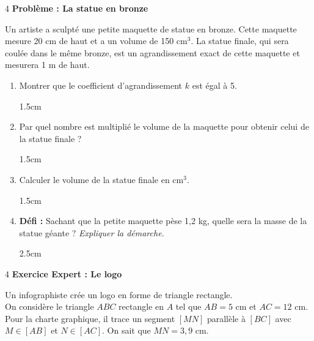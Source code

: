 \documentclass[a4paper]{book}
\begin{document}
{     
    \begin{exerciceNote}{4}
        \textbf{Problème : La statue en bronze}
        
        Un artiste a sculpté une petite maquette de statue en bronze. Cette maquette mesure 20 cm de haut et a un volume de 150 cm$^3$. 
        La statue finale, qui sera coulée dans le même bronze, est un agrandissement exact de cette maquette et mesurera 1 m de haut.
        
        \begin{enumerate}
            \item Montrer que le coefficient d'agrandissement $k$ est égal à 5.
            \begin{ZoneReponse}{1.5cm}
            \end{ZoneReponse}
            
            \item Par quel nombre est multiplié le volume de la maquette pour obtenir celui de la statue finale ?
            \begin{ZoneReponse}{1.5cm}
            \end{ZoneReponse}
            
            \item Calculer le volume de la statue finale en cm$^3$.
            \begin{ZoneReponse}{1.5cm}
            \end{ZoneReponse}

\newpage
            
            \item \textbf{Défi :} Sachant que la petite maquette pèse 1,2 kg, quelle sera la masse de la statue géante ? \textit{Expliquer la démarche.}
            \begin{ZoneReponse}{2.5cm}
            \end{ZoneReponse}
        \end{enumerate}
    \end{exerciceNote}


    \begin{exerciceNote}{4}
        \textbf{Exercice Expert : Le logo}
        
        Un infographiste crée un logo en forme de triangle rectangle. \\
        On considère le triangle $ABC$ rectangle en $A$ tel que $AB = 5$ cm et $AC = 12$ cm.
        Pour la charte graphique, il trace un segment $[MN]$ parallèle à $[BC]$ avec $M \in [AB]$ et $N \in [AC]$. 
        On sait que $MN = 3,9$ cm.
        

\end{exerciceNote}}
\end{document}
